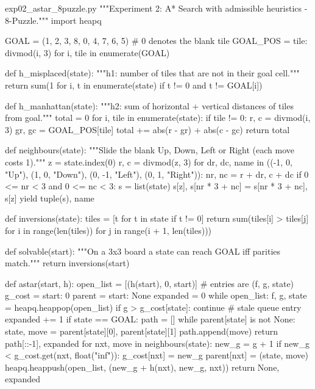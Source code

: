 \documentclass[11pt,a4paper]{article}
\begin{document}
\begin{pycode}{exp02\_astar\_8puzzle.py}
"""Experiment 2: A* Search with admissible heuristics - 8-Puzzle."""
import heapq

GOAL = (1, 2, 3,
        8, 0, 4,
        7, 6, 5)                      # 0 denotes the blank tile
GOAL_POS = {tile: divmod(i, 3) for i, tile in enumerate(GOAL)}


def h_misplaced(state):
    """h1: number of tiles that are not in their goal cell."""
    return sum(1 for i, t in enumerate(state) if t != 0 and t != GOAL[i])


def h_manhattan(state):
    """h2: sum of horizontal + vertical distances of tiles from goal."""
    total = 0
    for i, tile in enumerate(state):
        if tile != 0:
            r, c = divmod(i, 3)
            gr, gc = GOAL_POS[tile]
            total += abs(r - gr) + abs(c - gc)
    return total


def neighbours(state):
    """Slide the blank Up, Down, Left or Right (each move costs 1)."""
    z = state.index(0)
    r, c = divmod(z, 3)
    for dr, dc, name in ((-1, 0, "Up"), (1, 0, "Down"),
                         (0, -1, "Left"), (0, 1, "Right")):
        nr, nc = r + dr, c + dc
        if 0 <= nr < 3 and 0 <= nc < 3:
            s = list(state)
            s[z], s[nr * 3 + nc] = s[nr * 3 + nc], s[z]
            yield tuple(s), name


def inversions(state):
    tiles = [t for t in state if t != 0]
    return sum(tiles[i] > tiles[j]
               for i in range(len(tiles)) for j in range(i + 1, len(tiles)))


def solvable(start):
    """On a 3x3 board a state can reach GOAL iff parities match."""
    return inversions(start) %


def astar(start, h):
    open_list = [(h(start), 0, start)]          # entries are (f, g, state)
    g_cost = {start: 0}
    parent = {start: None}
    expanded = 0
    while open_list:
        f, g, state = heapq.heappop(open_list)
        if g > g_cost[state]:
            continue                            # stale queue entry
        expanded += 1
        if state == GOAL:
            path = []
            while parent[state] is not None:
                state, move = parent[state][0], parent[state][1]
                path.append(move)
            return path[::-1], expanded
        for nxt, move in neighbours(state):
            new_g = g + 1
            if new_g < g_cost.get(nxt, float("inf")):
                g_cost[nxt] = new_g
                parent[nxt] = (state, move)
                heapq.heappush(open_list, (new_g + h(nxt), new_g, nxt))
    return None, expanded



\end{pycode}
\end{document}
